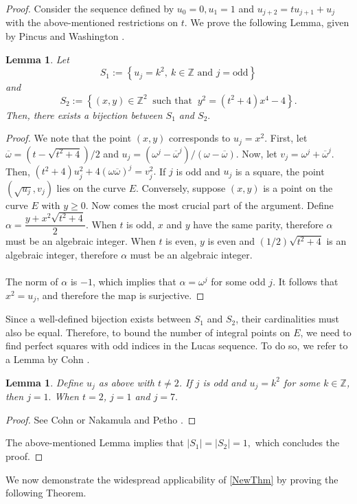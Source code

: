 \documentclass[12pt]{amsart}
\renewcommand{\qedsymbol}{$\blacksquare$}
\theoremstyle{plain}
\newtheorem{lemma}[thm]{Lemma}
\theoremstyle{definition}
\theoremstyle{remark}
\numberwithin{equation}{section}
\numberwithin{thm}{section}
\theoremstyle{named}
\theoremstyle{named}
\begin{document}
\begin{proof}
      Consider the sequence defined by $u_0 = 0, u_1 = 1$ and $u_{j+2} = tu_{j+1} + u_{j}$ with the above-mentioned restrictions on $t$. We prove the following Lemma, given by {Pincus and Washington} \cite{pincus2024field}.
\begin{lemma}\label{Bijection}
    Let $$S_1:= \left\{u_j = k^2,\ k \in \mathbb{Z} \text{ and } j = \text{odd} \right\}$$ and $$S_2:= \left \{ (x,y) \in \mathbb{Z}^2 \ \text{ such that } \ y^2 = (t^2 +4)x^4 - 4\right \}.$$ Then, there exists a bijection between $S_1$ and $S_2.$
 \end{lemma}
 \begin{proof}

We note that the point $(x,y)$ corresponds to $u_j = x^2$. First, let $\overline{\omega}=(t-\sqrt{t^2+4})/2$ and $u_j=(\omega^j-\overline{\omega}^j)/(\omega-\overline{\omega})$. Now, let $v_j=\omega^j+\overline{\omega}^j$. Then, 
$
(t^2+4)u_j^2+4(\omega\overline{\omega})^j=v_j^2.$
If $j$ is odd and $u_j$ is a square, the point $(\sqrt{u_j}, v_j)$ lies on the curve $E$. Conversely, suppose $(x, y)$ is a point on the curve $E$ with $y\ge 0$. Now comes the most crucial part of the argument. Define
$
\alpha=\dfrac{y+x^2\sqrt{t^2+4}}{2}.
$
When $t$ is odd, $x$ and $y$ have the same parity, therefore $\alpha$ must be an algebraic integer. When $t$ is even, $y$ is even and $(1/2)\sqrt{t^2+4}$ is an algebraic integer, therefore $\alpha$ must be an algebraic integer. \\ \\ \noindent The norm of $\alpha$ is $-1$, which implies that $\alpha=\omega^j$ for some odd $j$. It follows that $x^2=u_j$, and therefore the map is surjective.
     
 \end{proof}
 Since a well-defined bijection exists between $S_1$ and $S_2$, their cardinalities must also be equal. Therefore, to bound the number of integral points on $E$, we need to find perfect squares with odd indices in the Lucas sequence. To do so, we refer to a Lemma by {Cohn} \cite{https://doi.org/10.1112/plms/s3-16.1.153}.
\begin{lemma}
Define $u_j$ as above with $t \neq 2$. If $j$ is odd and $u_j = k^2$ for some $k \in \mathbb{Z}$, then $j = 1.$ When $t = 2$, $j = 1$ and $j = 7.$
\end{lemma}
 \begin{proof}\renewcommand{\qedsymbol}{}
     See {Cohn} \cite{https://doi.org/10.1112/plms/s3-16.1.153} or {Nakamula and Petho} \cite{NakamulaPethő+1998+409+422}.
 \end{proof}
 \noindent The above-mentioned Lemma implies that $|S_1| = |S_2| = 1,$ which concludes the proof. 
 \end{proof} 
 We now demonstrate the widespread applicability of \ref{NewThm} by proving the following Theorem.
\end{document}
